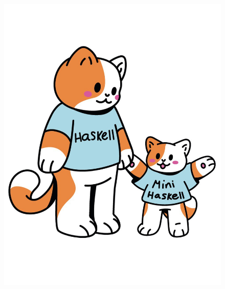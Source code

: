 
\begin{figure}[htbp]
    \centerline{\includegraphics[scale=0.20]{assets/06_gatito_minHs.jpg}}       
\end{figure}

